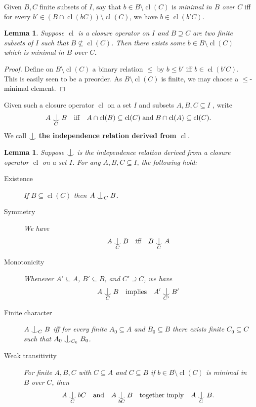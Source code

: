 \documentclass[12pt]{amsart}
\theoremstyle{plain}
\newtheorem{lemma}[theorem]{Lemma}
\theoremstyle{definition}
\DeclareMathOperator{\cl}{cl}
\newcommand{\forkindep}[1][]{%
  \mathrel{
    \mathop{
      \vcenter{
        \hbox{\oalign{\noalign{\kern-.3ex}\hfil$\vert$\hfil\cr
              \noalign{\kern-.7ex}
              $\smile$\cr\noalign{\kern-.3ex}}}
      }
    }\displaylimits_{#1}
  }
}
\begin{document}
Given $B, C$ finite subsets of $I$, say that $b \in B \setminus \cl(C)$ is \emph{minimal in $B$ over $C$} iff for every $b' \in (B \cap \cl(bC)) \setminus \cl(C)$, we have $b \in \cl(b'C)$.

\begin{lemma}
Suppose $\cl$ is a closure operator on $I$ and $B \supseteq C$ are two finite subsets of $I$ such that $B \not\subseteq \cl(C)$. Then there exists some $b \in B \setminus \cl(C)$ which is minimal in $B$ over $C$.
\end{lemma}

\begin{proof}
Define on $B \setminus \cl(C)$ a binary relation $\le$ by $b \le b'$ iff $b \in \cl(b'C)$.
This is easily seen to be a preorder.
As $B \setminus \cl(C)$ is finite, we may choose a $\le$-minimal element.
\end{proof}


Given such a closure operator $\cl$ on a set $I$ and subsets $A, B, C \subseteq I$ , write 
\[A \forkindep[C] B \quad \text{iff} \quad A \cap \cl(B) \subseteq \cl(C) \; \text{and} \; B \cap \cl(A) \subseteq \cl(C).\]
We call $\forkindep$ \textbf{the independence relation derived from $\cl$}.

\begin{lemma}\label{lem:fork_props}
Suppose $\forkindep$ is the independence relation derived from a closure operator $\cl$ on a set $I$. For any $A, B, C \subseteq I$, the following hold:
\begin{description}
    \item[Existence] If $B \subseteq \cl(C)$ then $A \forkindep[C] B$.
    \item[Symmetry] We have
    \[ A \forkindep[C] B \quad \text{iff} \quad B \forkindep[C] A\]
    \item[Monotonicity] Whenever $A' \subseteq A$, $B' \subseteq B$, and $C' \supseteq C$, we have
    \[ A \forkindep[C] B\quad  \text{implies} \quad A' \forkindep[C'] B' \]
    \item[Finite character] $A \forkindep[C] B$ iff for every finite $A_0 \subseteq A$ and $B_0 \subseteq B$ there exists finite $C_0 \subseteq C$ such that $A_0 \forkindep[C_0] B_0$.
    \item[Weak transitivity] For finite $A, B, C$ with $C \subseteq A$ and $C \subseteq B$ if $b \in B \setminus \cl(C)$ is minimal in $B$ over $C$, then 
    \[ A \forkindep[C] bC \quad \text{and} \quad  A \forkindep[bC] B \quad \text{together imply} \quad A \forkindep[C] B. \]
\end{description}
\end{lemma}
\end{document}
